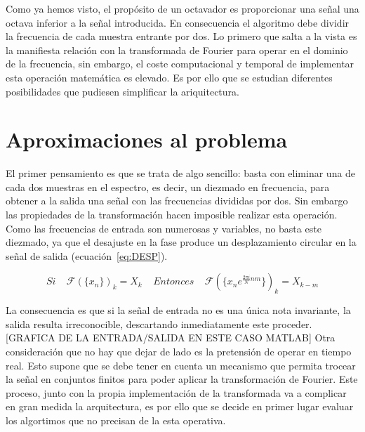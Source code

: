Como ya hemos visto, el propósito de un octavador es proporcionar una señal una octava inferior a la señal introducida. En consecuencia el algoritmo debe dividir la frecuencia de cada muestra entrante por dos. Lo primero que salta a la vista es la manifiesta relación con la transformada de Fourier para operar en el dominio de la frecuencia, sin embargo, el coste computacional y temporal de implementar esta operación matemática es elevado. Es por ello que se estudian diferentes posibilidades que pudiesen simplificar la ariquitectura.

\section{Aproximaciones al problema}
El primer pensamiento es que se trata de algo sencillo: basta con eliminar una de cada dos muestras en el espectro, es decir, un diezmado en frecuencia, para obtener a la salida una señal con las frecuencias divididas por dos. Sin embargo las propiedades de la transformación hacen imposible realizar esta operación. Como las frecuencias de entrada son numerosas y variables, no basta este diezmado, ya que el desajuste en la fase produce un desplazamiento circular en la señal de salida (ecuación~\ref{eq:DESP}). 

\begin{equation}
\label{eq:DESP}
Si~~~~~\mathscr{F}(\{x_{n}\})_{k} = X_{k}~~~~~Entonces~~~~~\mathscr{F}(\{x_{n}e^{\frac{2\pi i}{N}nm}\})_{k}= X_{k-m} 
\end{equation}

La consecuencia es que si la señal de entrada no es una única nota invariante, la salida resulta irreconocible, descartando inmediatamente este proceder. [GRAFICA DE LA ENTRADA/SALIDA EN ESTE CASO MATLAB] Otra consideración que no hay que dejar de lado es la pretensión de operar en tiempo real. Esto supone que se debe tener en cuenta un mecanismo que permita trocear la señal en conjuntos finitos para poder aplicar la transformación de Fourier. Este proceso, junto con la propia implementación de la transformada va a complicar en gran medida la arquitectura, es por ello que se decide en primer lugar evaluar los algortimos que no precisan de la esta operativa.

